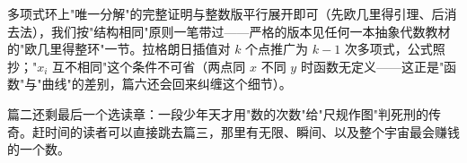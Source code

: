 \begin{chengshi}
多项式环上"唯一分解"的完整证明与整数版平行展开即可（先欧几里得引理、后消去法），我们按"结构相同"原则一笔带过——严格的版本见任何一本抽象代数教材的"欧几里得整环"一节。拉格朗日插值对 $k$ 个点推广为 $k-1$ 次多项式，公式照抄；"$x_i$ 互不相同"这个条件不可省（两点同 $x$ 不同 $y$ 时函数无定义——这正是"函数"与"曲线"的差别，篇六还会回来纠缠这个细节）。
\end{chengshi}

篇二还剩最后一个选读章：一段少年天才用"数的次数"给"尺规作图"判死刑的传奇。赶时间的读者可以直接跳去篇三，那里有无限、瞬间、以及整个宇宙最会赚钱的一个数。
